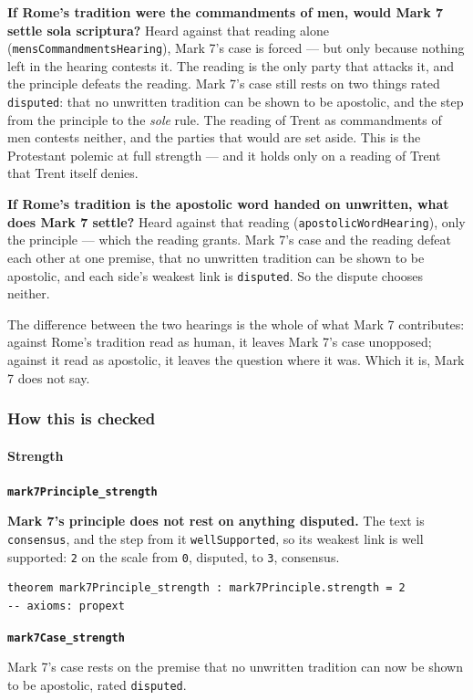 \documentclass[11pt]{article}
\begin{document}
\textbf{If Rome’s tradition were the commandments of men, would Mark 7 settle sola scriptura?} Heard against that reading alone (\texttt{mens\allowbreak{}Commandments\allowbreak{}Hearing}), Mark 7’s case is forced — but only because nothing left in the hearing contests it. The reading is the only party that attacks it, and the principle defeats the reading. Mark 7’s case still rests on two things rated \texttt{disputed}: that no unwritten tradition can be shown to be apostolic, and the step from the principle to the \emph{sole} rule. The reading of Trent as commandments of men contests neither, and the parties that would are set aside. This is the Protestant polemic at full strength — and it holds only on a reading of Trent that Trent itself denies.

\textbf{If Rome’s tradition is the apostolic word handed on unwritten, what does Mark 7 settle?} Heard against that reading (\texttt{apostolic\allowbreak{}Word\allowbreak{}Hearing}), only the principle — which the reading grants. Mark 7’s case and the reading defeat each other at one premise, that no unwritten tradition can be shown to be apostolic, and each side’s weakest link is \texttt{disputed}. So the dispute chooses neither.

The difference between the two hearings is the whole of what Mark 7 contributes: against Rome’s tradition read as human, it leaves Mark 7’s case unopposed; against it read as apostolic, it leaves the question where it was. Which it is, Mark 7 does not say.

\subsubsection*{How this is checked}
\paragraph*{Strength}
\leavevmode\par\nobreak
\par\medskip\noindent\textbf{\texttt{mark7\allowbreak{}Principle\_\allowbreak{}strength}}\par\nobreak\noindent
\textbf{Mark 7’s principle does not rest on anything disputed.} The text is \texttt{consensus}, and the step from it \texttt{well\allowbreak{}Supported}, so its weakest link is well supported: \texttt{2} on the scale from \texttt{0}, disputed, to \texttt{3}, consensus.

{\small\begin{verbatim}
theorem mark7Principle_strength : mark7Principle.strength = 2
-- axioms: propext
\end{verbatim}}
\par\medskip\noindent\textbf{\texttt{mark7\allowbreak{}Case\_\allowbreak{}strength}}\par\nobreak\noindent
Mark 7’s case rests on the premise that no unwritten tradition can now be shown to be apostolic, rated \texttt{disputed}.
\end{document}
